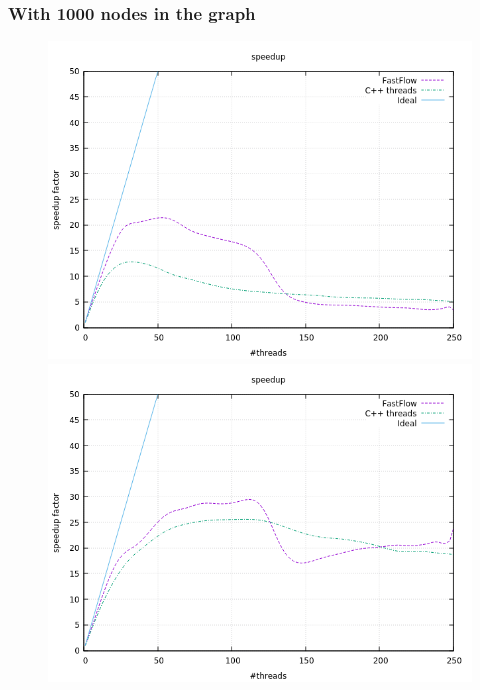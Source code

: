 \documentclass[a4paper,10pt]{article}
\begin{document}
		\subsubsection{With 1000 nodes in the graph}
		\begin{figure}[H]
			\centering
			\begin{minipage}[t]{0.32\linewidth}
				\includegraphics[width=\linewidth]{BenchMarkTSP/speedup/1000/SU1000500_zoom.png}
				\subcaption{}
			\end{minipage}%
			\begin{minipage}[t]{0.32\linewidth}
				\includegraphics[width=\linewidth]{BenchMarkTSP/speedup/1000/SU10005000_zoom.png}
				\subcaption{}
			\end{minipage}

\end{figure}
\end{document}
